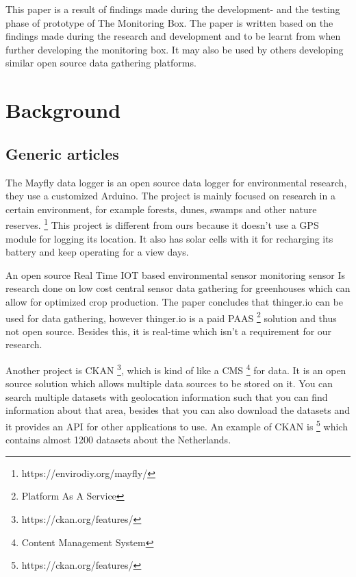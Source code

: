 \documentclass[conference]{IEEEtran}
\begin{document}
\par
This paper is a result of findings made during the development-  and the testing phase of prototype of The Monitoring Box. The paper is written based on the findings made during the research and development and to be learnt from when further developing the monitoring box. It may also be used by others developing similar open source data gathering platforms.

\section{Background}
\subsection{Generic articles}
The Mayfly data logger is an open source data logger for environmental research, they use a customized Arduino. The project is mainly focused on research in a certain environment, for example forests, dunes, swamps and other nature reserves. \footnote{https://envirodiy.org/mayfly/} This project is different from ours because it doesn't use a GPS module for logging its location. It also has solar cells with it for recharging its battery and keep operating for a view days. 
\par
An open source Real Time IOT based environmental sensor monitoring sensor \cite{ICRISET2017:An_open_source_Real} Is research done on low cost central sensor data gathering for greenhouses which can allow for optimized crop production. The paper concludes that thinger.io can be used for data gathering, however thinger.io is a paid PAAS \footnote{Platform As A Service} solution and thus not open source. Besides this, it is real-time which isn't a requirement for our research.
\par
Another project is CKAN \footnote{https://ckan.org/features/}, which is kind of like a CMS \footnote{Content Management System} for data. It is an open source solution which allows multiple data sources to be stored on it. You can search multiple datasets with geolocation information such that you can find information about that area, besides that you can also download the datasets and it provides an API for other applications to use. An example of CKAN is \footnote{https://ckan.org/features/}  which contains almost 1200 datasets about the Netherlands.
\end{document}
